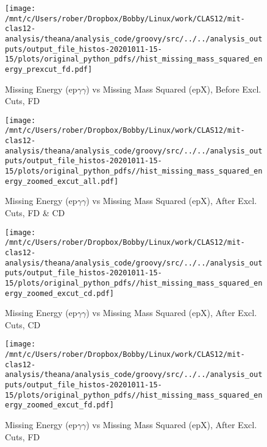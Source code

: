 \documentclass{article}
\begin{document}
\begin{landscape}
    \begin{figure}[h]
        \centering

        \texttt{[image: /mnt/c/Users/rober/Dropbox/Bobby/Linux/work/CLAS12/mit-clas12-analysis/theana/analysis\_code/groovy/src/../../analysis\_outputs/output\_file\_histos-20201011-15-15/plots/original\_python\_pdfs//hist\_missing\_mass\_squared\_energy\_prexcut\_fd.pdf]}
        \captionsetup{textformat=empty,labelformat=blank}
        \caption{Missing Energy (ep$\gamma$$\gamma$) vs Missing Mass Squared (epX), Before Excl. Cuts, FD}
    \end{figure}
    \clearpage
    
    \begin{figure}[h]
        \centering

        \texttt{[image: /mnt/c/Users/rober/Dropbox/Bobby/Linux/work/CLAS12/mit-clas12-analysis/theana/analysis\_code/groovy/src/../../analysis\_outputs/output\_file\_histos-20201011-15-15/plots/original\_python\_pdfs//hist\_missing\_mass\_squared\_energy\_zoomed\_excut\_all.pdf]}
        \captionsetup{textformat=empty,labelformat=blank}
        \caption{Missing Energy (ep$\gamma$$\gamma$) vs Missing Mass Squared (epX), After Excl. Cuts, FD \& CD}
    \end{figure}
    \clearpage
    
    \begin{figure}[h]
        \centering

        \texttt{[image: /mnt/c/Users/rober/Dropbox/Bobby/Linux/work/CLAS12/mit-clas12-analysis/theana/analysis\_code/groovy/src/../../analysis\_outputs/output\_file\_histos-20201011-15-15/plots/original\_python\_pdfs//hist\_missing\_mass\_squared\_energy\_zoomed\_excut\_cd.pdf]}
        \captionsetup{textformat=empty,labelformat=blank}
        \caption{Missing Energy (ep$\gamma$$\gamma$) vs Missing Mass Squared (epX), After Excl. Cuts, CD}
    \end{figure}
    \clearpage
    
    \begin{figure}[h]
        \centering

        \texttt{[image: /mnt/c/Users/rober/Dropbox/Bobby/Linux/work/CLAS12/mit-clas12-analysis/theana/analysis\_code/groovy/src/../../analysis\_outputs/output\_file\_histos-20201011-15-15/plots/original\_python\_pdfs//hist\_missing\_mass\_squared\_energy\_zoomed\_excut\_fd.pdf]}
        \captionsetup{textformat=empty,labelformat=blank}
        \caption{Missing Energy (ep$\gamma$$\gamma$) vs Missing Mass Squared (epX), After Excl. Cuts, FD}
    \end{figure}
    \clearpage
    

\end{landscape}
\end{document}
